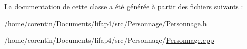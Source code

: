 La documentation de cette classe a été générée à partir des fichiers suivants \+:\begin{DoxyCompactItemize}
\item 
/home/corentin/\+Documents/lifap4/src/\+Personnage/\hyperlink{_personnage_8h}{Personnage.\+h}\item 
/home/corentin/\+Documents/lifap4/src/\+Personnage/\hyperlink{_personnage_8cpp}{Personnage.\+cpp}\end{DoxyCompactItemize}
